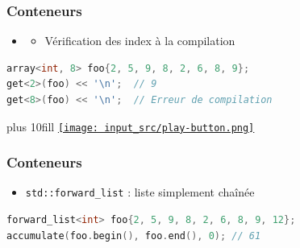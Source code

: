 \documentclass[C++.tex]{subfiles}
\begin{document}
\begin{frame}[fragile]
	\frametitle{Conteneurs}

	\begin{itemize}
		\item[]\begin{itemize}
			\item Vérification des index à la compilation
		\end{itemize}
	\end{itemize}

	\begin{lstlisting}[language=C++]
array<int, 8> foo{2, 5, 9, 8, 2, 6, 8, 9};
get<2>(foo) << '\n';  // 9
get<8>(foo) << '\n';  // Erreur de compilation\end{lstlisting}

	\vskip 10mm plus 10fill
	\hfill
	\href{https://godbolt.org/#g:!((g:!((g:!((h:codeEditor,i:(filename:'1',fontScale:14,fontUsePx:'0',j:1,lang:c%2B%2B,selection:(endColumn:6,endLineNumber:12,positionColumn:6,positionLineNumber:12,selectionStartColumn:6,selectionStartLineNumber:12,startColumn:6,startLineNumber:12),source:'%23include+%3Ciostream%3E%0A%23include+%3Carray%3E%0A%23include+%3Cnumeric%3E%0A%0Aint+main()%0A%7B%0A++%7B%0A++++std::array%3Cint,+8%3E+foo%7B2,+5,+9,+8,+2,+6,+8,+9%7D%3B%0A++++std::cout+%3C%3C+std::accumulate(foo.begin(),+foo.end(),+0)+%3C%3C+!'%5Cn!'%3B%0A++%7D%0A%0A%23if+0%0A++%7B%0A++++std::array%3Cint,+8%3E+foo%7B2,+5,+9,+8,+2,+6,+8,+9,+17%7D%3B%0A++%7D%0A%23endif%0A%7D%0A'),l:'5',n:'0',o:'C%2B%2B+source+%231',t:'0')),k:50,l:'4',n:'0',o:'',s:0,t:'0'),(g:!((h:executor,i:(argsPanelShown:'1',compilationPanelShown:'0',compiler:g112,compilerOutShown:'0',execArgs:'',execStdin:'',fontScale:14,fontUsePx:'0',j:1,lang:c%2B%2B,libs:!((name:boost,ver:'175')),options:'-std%3Dc%2B%2B11',source:1,stdinPanelShown:'1',tree:'1',wrap:'0'),l:'5',n:'0',o:'Executor+x86-64+gcc+11.2+(C%2B%2B,+Editor+%231)',t:'0')),header:(),k:50,l:'4',n:'0',o:'',s:0,t:'0')),l:'2',n:'0',o:'',t:'0')),version:4}{\texttt{[image: input\_src/play-button.png]}}
\end{frame}

\begin{frame}[fragile]
\frametitle{Conteneurs}
	\begin{itemize}
		\item \lstinline|std::forward_list| : liste simplement chaînée
	\end{itemize}

	\begin{lstlisting}[language=C++]
forward_list<int> foo{2, 5, 9, 8, 2, 6, 8, 9, 12};
accumulate(foo.begin(), foo.end(), 0); // 61\end{lstlisting}
\end{frame}
\end{document}
